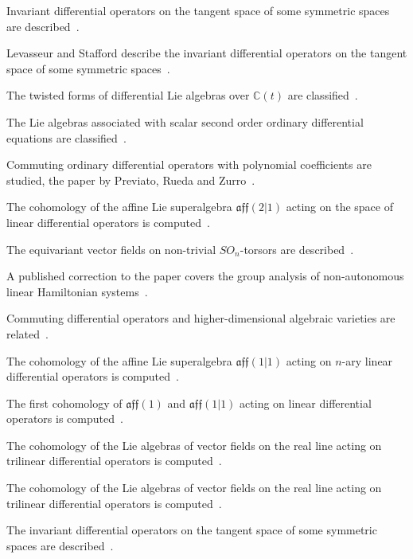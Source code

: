 Invariant differential operators on the tangent space of some symmetric spaces
are described~\cite{WlInvariantDifferentialOperators2020}.

Levasseur and Stafford describe the invariant differential operators on the
tangent space of some symmetric
spaces~\cite{WlInvariantDifferentialOperators2020}.

The twisted forms of differential Lie algebras over $\mathbb{C}(t)$ are
classified~\cite{WlTwistedFormsOfDifferentialLieA2020}.

The Lie algebras associated with scalar second order ordinary differential
equations are classified~\cite{WlLieAlgebrasAssociatedWithScala2020}.

Commuting ordinary differential operators with polynomial coefficients are
studied, the paper by Previato, Rueda and
Zurro~\cite{WlPreviatoERuedaSLZurroMACommuti2020}.

The cohomology of the affine Lie superalgebra $\mathfrak{aff}(2|1)$ acting on
the space of linear differential operators is
computed~\cite{WlCohomologyOfAff21ActingOnTheSp2020}.

The equivariant vector fields on non-trivial $SO_n$-torsors are
described~\cite{WlEquivariantVectorFieldsOnNonTr2020}.

A published correction to the paper covers the group analysis of non-autonomous linear Hamiltonian
systems~\cite{WlErratumToGroupAnalysisOfNonAut2020}.

Commuting differential operators and higher-dimensional algebraic varieties
are related~\cite{WlCommutingDifferentialOperators2020}.

The cohomology of the affine Lie superalgebra $\mathfrak{aff}(1|1)$ acting on
$n$-ary linear differential operators is
computed~\cite{WlCohomologyOfAff11ActingOnTheSp2020}.

The first cohomology of $\mathfrak{aff}(1)$ and $\mathfrak{aff}(1|1)$ acting
on linear differential operators is
computed~\cite{WlFirstCohomologyOfAff1AndAff11A2020}.

The cohomology of the Lie algebras of vector fields on the real line acting on
trilinear differential operators is
computed~\cite{WlCohomologyOfTheVectorFieldsLie2020}.

The cohomology of the Lie algebras of vector fields on the real line acting on
trilinear differential operators is
computed~\cite{WlCohomologyOfTheVectorFieldsLie2020}.

The invariant differential operators on the tangent space of some symmetric
spaces are described~\cite{WlInvariantDifferentialOperators2020}.
